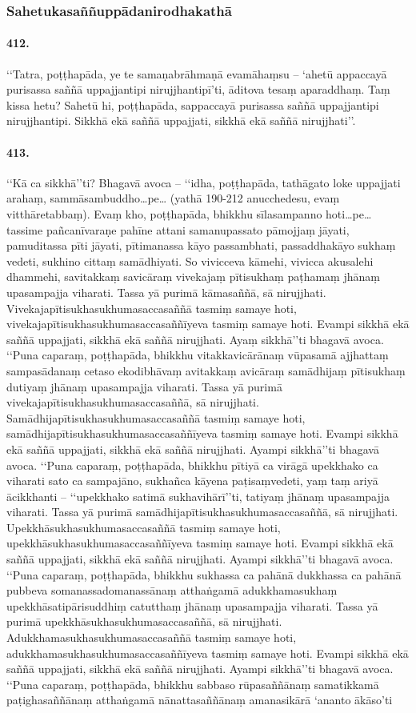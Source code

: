 \subsubsection{Sahetukasaññuppādanirodhakathā}

\paragraph{412.} ‘‘Tatra, poṭṭhapāda, ye te samaṇabrāhmaṇā evamāhaṃsu – ‘ahetū appaccayā purisassa saññā uppajjantipi nirujjhantipī’ti, āditova tesaṃ aparaddhaṃ. Taṃ kissa hetu? Sahetū hi, poṭṭhapāda, sappaccayā purisassa saññā uppajjantipi nirujjhantipi. Sikkhā ekā saññā uppajjati, sikkhā ekā saññā nirujjhati’’.

\paragraph{413.} ‘‘Kā ca sikkhā’’ti? Bhagavā avoca – ‘‘idha, poṭṭhapāda, tathāgato loke uppajjati arahaṃ, sammāsambuddho…pe… (yathā 190-212 anucchedesu, evaṃ vitthāretabbaṃ). Evaṃ kho, poṭṭhapāda, bhikkhu sīlasampanno hoti…pe… tassime pañcanīvaraṇe pahīne attani samanupassato pāmojjaṃ jāyati, pamuditassa pīti jāyati, pītimanassa kāyo passambhati, passaddhakāyo sukhaṃ vedeti, sukhino cittaṃ samādhiyati. So vivicceva kāmehi, vivicca akusalehi dhammehi, savitakkaṃ savicāraṃ vivekajaṃ pītisukhaṃ paṭhamaṃ jhānaṃ upasampajja viharati. Tassa yā purimā kāmasaññā, sā nirujjhati. Vivekajapītisukhasukhumasaccasaññā tasmiṃ samaye hoti, vivekajapītisukhasukhumasaccasaññīyeva tasmiṃ samaye hoti. Evampi sikkhā ekā saññā uppajjati, sikkhā ekā saññā nirujjhati. Ayaṃ sikkhā’’ti bhagavā avoca. ‘‘Puna caparaṃ, poṭṭhapāda, bhikkhu vitakkavicārānaṃ vūpasamā ajjhattaṃ sampasādanaṃ cetaso ekodibhāvaṃ avitakkaṃ avicāraṃ samādhijaṃ pītisukhaṃ dutiyaṃ jhānaṃ upasampajja viharati. Tassa yā purimā vivekajapītisukhasukhumasaccasaññā, sā nirujjhati. Samādhijapītisukhasukhumasaccasaññā tasmiṃ samaye hoti, samādhijapītisukhasukhumasaccasaññīyeva tasmiṃ samaye hoti. Evampi sikkhā ekā saññā uppajjati, sikkhā ekā saññā nirujjhati. Ayampi sikkhā’’ti bhagavā avoca. ‘‘Puna caparaṃ, poṭṭhapāda, bhikkhu pītiyā ca virāgā upekkhako ca viharati sato ca sampajāno, sukhañca kāyena paṭisaṃvedeti, yaṃ taṃ ariyā ācikkhanti – ‘‘upekkhako satimā sukhavihārī’’ti, tatiyaṃ jhānaṃ upasampajja viharati. Tassa yā purimā samādhijapītisukhasukhumasaccasaññā, sā nirujjhati. Upekkhāsukhasukhumasaccasaññā tasmiṃ samaye hoti, upekkhāsukhasukhumasaccasaññīyeva tasmiṃ samaye hoti. Evampi sikkhā ekā saññā uppajjati, sikkhā ekā saññā nirujjhati. Ayampi sikkhā’’ti bhagavā avoca. ‘‘Puna caparaṃ, poṭṭhapāda, bhikkhu sukhassa ca pahānā dukkhassa ca pahānā pubbeva somanassadomanassānaṃ atthaṅgamā adukkhamasukhaṃ upekkhāsatipārisuddhiṃ catutthaṃ jhānaṃ upasampajja viharati. Tassa yā purimā upekkhāsukhasukhumasaccasaññā, sā nirujjhati. Adukkhamasukhasukhumasaccasaññā tasmiṃ samaye hoti, adukkhamasukhasukhumasaccasaññīyeva tasmiṃ samaye hoti. Evampi sikkhā ekā saññā uppajjati, sikkhā ekā saññā nirujjhati. Ayampi sikkhā’’ti bhagavā avoca. ‘‘Puna caparaṃ, poṭṭhapāda, bhikkhu sabbaso rūpasaññānaṃ samatikkamā paṭighasaññānaṃ atthaṅgamā nānattasaññānaṃ amanasikārā ‘ananto ākāso’ti 